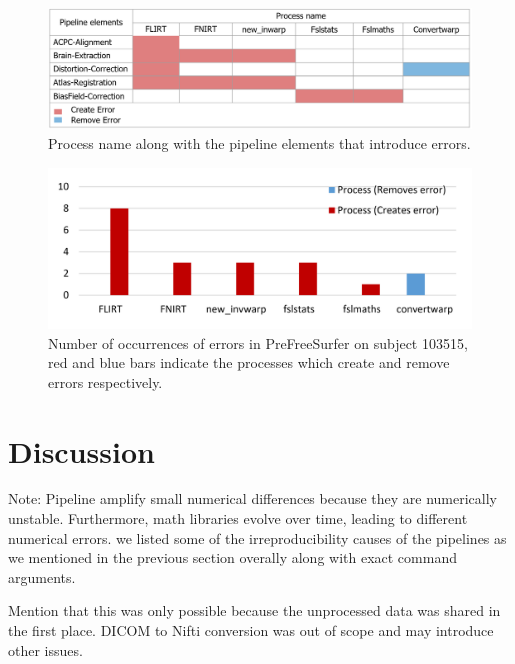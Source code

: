 \documentclass[a4paper,num-refs]{oup-contemporary}
\newcommand{\note}[2]{\color{blue}Note: #1\color{black}}
\begin{document}
\begin{figure}
\centering
  \includegraphics[width=\columnwidth]{images/pfs_table.png}
  \caption{Process name along with the pipeline elements that introduce 
  errors.}
  \label{fig:pfs_table}
\end{figure}

\begin{figure}
\centering
  \includegraphics[width=\columnwidth]{images/pfs_chart.png} \caption{Number 
  of occurrences of errors in PreFreeSurfer on subject 103515, red and 
  blue bars indicate the processes which create and remove errors 
  respectively.} 
  \label{fig:pfs_chart}
\end{figure}


\section{Discussion}

\note{Pipeline amplify small numerical differences because they are numerically 
unstable. Furthermore, math libraries evolve over time, leading to 
different numerical errors. we listed some of the irreproducibility 
causes of the pipelines as we mentioned in the previous section 
overally along with exact command arguments.

Mention that this was only possible because the unprocessed data was 
shared in the first place. DICOM to Nifti conversion was out of scope 
and may introduce other issues.}

\section{Conclusion}
\end{document}
